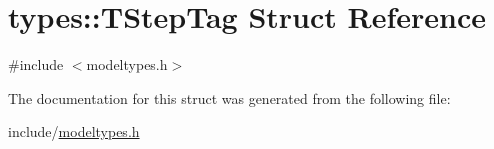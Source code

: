 \hypertarget{structtypes_1_1_t_step_tag}{}\section{types\+::T\+Step\+Tag Struct Reference}
\label{structtypes_1_1_t_step_tag}


{\ttfamily \#include $<$modeltypes.\+h$>$}



The documentation for this struct was generated from the following file\+:\begin{DoxyCompactItemize}
\item 
include/\mbox{\hyperlink{modeltypes_8h}{modeltypes.\+h}}\end{DoxyCompactItemize}
